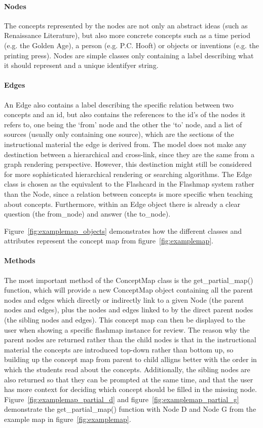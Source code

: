 \paragraph{Nodes} The concepts represented by the nodes are not only an abstract ideas (such as Renaissance Literature), but also more concrete concepts such as a time period (e.g. the Golden Age), a person (e.g. P.C. Hooft) or objects or inventions (e.g. the printing press). Nodes are simple classes only containing a label describing what it should represent and a unique identifyer string.

\paragraph{Edges} An Edge also contains a label describing the specific relation between two concepts and an id, but also contains the references to the id's of the nodes it refers to, one being the `from' node and the other the `to' node, and a list of sources (usually only containing one source), which are the sections of the instructional material the edge is derived from. The model does not make any destinction between a hierarchical and cross-link, since they are the same from a graph rendering perspective. However, this destinction might still be considered for more sophisticated hierarchical rendering or searching algorithms. The Edge class is chosen as the equivalent to the Flashcard in the Flashmap system rather than the Node, since a relation between concepts is more specific when teaching about concepts. Furthermore, within an Edge object there is already a clear question (the from\_node) and answer (the to\_node).

Figure~\ref{fig:examplemap_objects} demonstrates how the different classes and attributes represent the concept map from figure~\ref{fig:examplemap}.

\paragraph{Methods} The most important method of the ConceptMap class is the get\_partial\_map() function, which will provide a new ConceptMap object containing all the parent nodes and edges which directly or indirectly link to a given Node (the parent nodes and edges), plus the nodes and edges linked to by the direct parent nodes (the sibling nodes and edges). This concept map can then be displayed to the user when showing a specific flashmap instance for review. The reason why the parent nodes are returned rather than the child nodes is that in the instructional material the concepts are introduced top-down rather than bottom up, so building up the concept map from parent to child alligns better with the order in which the students read about the concepts. Additionally, the sibling nodes are also returned so that they can be prompted at the same time, and that the user has more context for deciding which concept should be filled in the missing node. Figure~\ref{fig:examplemap_partial_d} and figure~\ref{fig:examplemap_partial_g} demonstrate the get\_partial\_map() function with Node D and Node G from the example map in figure~\ref{fig:examplemap}.

